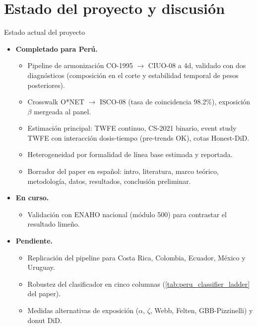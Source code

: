 \documentclass[9pt, aspectratio=169]{beamer}
\begin{document}
\section{Estado del proyecto y discusión}

\begin{frame}{Estado actual del proyecto}
  \small
  \begin{itemize}
    \item \textbf{Completado para Perú.}
      \begin{itemize}
        \item Pipeline de armonización CO-1995 $\to$ CIUO-08 a 4d, validado con dos diagnósticos (composición en el corte y estabilidad temporal de pesos posteriores).
        \item Crosswalk O*NET $\to$ ISCO-08 (tasa de coincidencia 98.2\%), exposición $\beta$ mergeada al panel.
        \item Estimación principal: TWFE continuo, CS-2021 binario, event study TWFE con interacción dosis-tiempo (pre-trends OK), cotas Honest-DiD.
        \item Heterogeneidad por formalidad de línea base estimada y reportada.
        \item Borrador del paper en español: intro, literatura, marco teórico, metodología, datos, resultados, conclusión preliminar.
      \end{itemize}
    \item \textbf{En curso.}
      \begin{itemize}
        \item Validación con ENAHO nacional (módulo 500) para contrastar el resultado limeño.
      \end{itemize}
    \item \textbf{Pendiente.}
      \begin{itemize}
        \item Replicación del pipeline para Costa Rica, Colombia, Ecuador, México y Uruguay.
        \item Robustez del clasificador en cinco columnas (\cref{tab:peru_classifier_ladder} del paper).
        \item Medidas alternativas de exposición ($\alpha$, $\zeta$, Webb, Felten, GBB-Pizzinelli) y donut DiD.
      \end{itemize}
  \end{itemize}
\end{frame}
\end{document}
